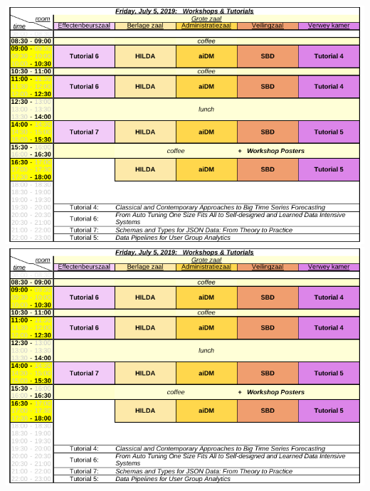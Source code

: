 \ifodd\value{page}
\includegraphics[angle=90,width=\textwidth]{schedule/p6.pdf}%
\else
\includegraphics[angle=270,width=\textwidth]{schedule/p6.pdf}%
\fi






